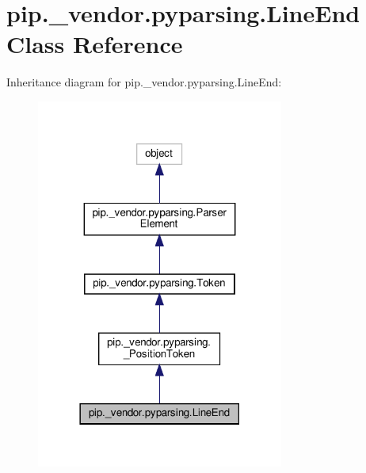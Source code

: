 \hypertarget{classpip_1_1__vendor_1_1pyparsing_1_1LineEnd}{}\section{pip.\+\_\+vendor.\+pyparsing.\+Line\+End Class Reference}
\label{classpip_1_1__vendor_1_1pyparsing_1_1LineEnd}


Inheritance diagram for pip.\+\_\+vendor.\+pyparsing.\+Line\+End\+:
\nopagebreak
\begin{figure}[H]
\begin{center}
\leavevmode
\includegraphics[width=230pt]{classpip_1_1__vendor_1_1pyparsing_1_1LineEnd__inherit__graph}
\end{center}
\end{figure}



